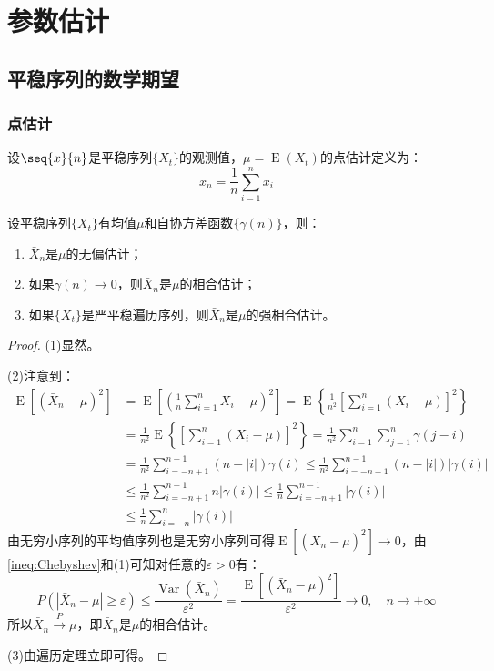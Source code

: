 \section{参数估计}

\subsection{平稳序列的数学期望}
\subsubsection{点估计}
\begin{definition}
	设$\seq{x}{n}$是平稳序列$\{X_t\}$的观测值，$\mu=\operatorname{E}(X_t)$的点估计定义为：
	\begin{equation*}
		\bar{x}_n=\frac{1}{n}\sum_{i=1}^{n}x_i
	\end{equation*}
\end{definition}
\begin{theorem}
	设平稳序列$\{X_t\}$有均值$\mu$和自协方差函数$\{\gamma(n)\}$，则：
	\begin{enumerate}
		\item $\bar{X}_n$是$\mu$的无偏估计；
		\item 如果$\gamma(n)\to0$，则$\bar{X}_n$是$\mu$的相合估计；
		\item 如果$\{X_t\}$是严平稳遍历序列，则$\bar{X}_n$是$\mu$的强相合估计。
	\end{enumerate}
\end{theorem}
\begin{proof}
	(1)显然。\par
	(2)注意到：
	\begin{align*}
		\operatorname{E}[(\bar{X}_n-\mu)^2]&=\operatorname{E}\left[\left(\frac{1}{n}\sum_{i=1}^{n}X_i-\mu\right)^2\right]=\operatorname{E}\left\{\frac{1}{n^2}\left[\sum_{i=1}^{n}(X_i-\mu)\right]^2\right\} \\
		&=\frac{1}{n^2}\operatorname{E}\left\{\left[\sum_{i=1}^{n}(X_i-\mu)\right]^2\right\}=\frac{1}{n^2}\sum_{i=1}^{n}\sum_{j=1}^{n}\gamma(j-i) \\
		&=\frac{1}{n^2}\sum_{i=-n+1}^{n-1}(n-|i|)\gamma(i)\leqslant\frac{1}{n^2}\sum_{i=-n+1}^{n-1}(n-|i|)|\gamma(i)| \\
		&\leqslant\frac{1}{n^2}\sum_{i=-n+1}^{n-1}n|\gamma(i)|\leqslant\frac{1}{n}\sum_{i=-n+1}^{n-1}|\gamma(i)| \\
		&\leqslant\frac{1}{n}\sum_{i=-n}^{n}|\gamma(i)|
	\end{align*}
	由无穷小序列的平均值序列也是无穷小序列可得$\operatorname{E}[(\bar{X}_n-\mu)^2]\to0$，由\cref{ineq:Chebyshev}和(1)可知对任意的$\varepsilon>0$有：
	\begin{equation*}
		P(|\bar{X}_n-\mu|\geqslant\varepsilon)\leqslant\frac{\operatorname{Var}(\bar{X}_n)}{\varepsilon^2}=\frac{\operatorname{E}[(\bar{X}_n-\mu)^2]}{\varepsilon^2}\to0,\quad n\to+\infty
	\end{equation*}
	所以$\bar{X}_n\overset{P}{\longrightarrow}\mu$，即$\bar{X}_n$是$\mu$的相合估计。\par
	(3)由遍历定理立即可得。
\end{proof}
